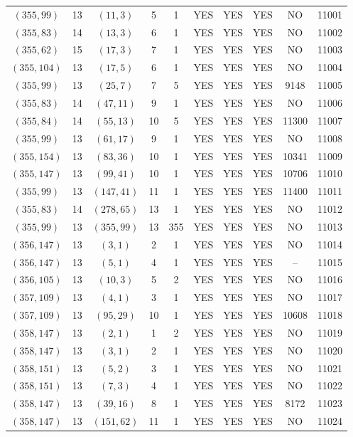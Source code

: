 \begin{longtable}{|c|c|c|c|c|c|c|c|c|c|}
$(355, 99)$ & 13 & $(11, 3)$ & 5 & 1 & YES & YES & YES & NO & 11001\\
$(355, 83)$ & 14 & $(13, 3)$ & 6 & 1 & YES & YES & YES & NO & 11002\\
$(355, 62)$ & 15 & $(17, 3)$ & 7 & 1 & YES & YES & YES & NO & 11003\\
$(355, 104)$ & 13 & $(17, 5)$ & 6 & 1 & YES & YES & YES & NO & 11004\\
$(355, 99)$ & 13 & $(25, 7)$ & 7 & 5 & YES & YES & YES & 9148 & 11005\\
$(355, 83)$ & 14 & $(47, 11)$ & 9 & 1 & YES & YES & YES & NO & 11006\\
$(355, 84)$ & 14 & $(55, 13)$ & 10 & 5 & YES & YES & YES & 11300 & 11007\\
$(355, 99)$ & 13 & $(61, 17)$ & 9 & 1 & YES & YES & YES & NO & 11008\\
$(355, 154)$ & 13 & $(83, 36)$ & 10 & 1 & YES & YES & YES & 10341 & 11009\\
$(355, 147)$ & 13 & $(99, 41)$ & 10 & 1 & YES & YES & YES & 10706 & 11010\\
$(355, 99)$ & 13 & $(147, 41)$ & 11 & 1 & YES & YES & YES & 11400 & 11011\\
$(355, 83)$ & 14 & $(278, 65)$ & 13 & 1 & YES & YES & YES & NO & 11012\\
$(355, 99)$ & 13 & $(355, 99)$ & 13 & 355 & YES & YES & YES & NO & 11013\\
$(356, 147)$ & 13 & $(3, 1)$ & 2 & 1 & YES & YES & YES & NO & 11014\\
$(356, 147)$ & 13 & $(5, 1)$ & 4 & 1 & YES & YES & YES & -- & 11015\\
$(356, 105)$ & 13 & $(10, 3)$ & 5 & 2 & YES & YES & YES & NO & 11016\\
$(357, 109)$ & 13 & $(4, 1)$ & 3 & 1 & YES & YES & YES & NO & 11017\\
$(357, 109)$ & 13 & $(95, 29)$ & 10 & 1 & YES & YES & YES & 10608 & 11018\\
$(358, 147)$ & 13 & $(2, 1)$ & 1 & 2 & YES & YES & YES & NO & 11019\\
$(358, 147)$ & 13 & $(3, 1)$ & 2 & 1 & YES & YES & YES & NO & 11020\\
$(358, 151)$ & 13 & $(5, 2)$ & 3 & 1 & YES & YES & YES & NO & 11021\\
$(358, 151)$ & 13 & $(7, 3)$ & 4 & 1 & YES & YES & YES & NO & 11022\\
$(358, 147)$ & 13 & $(39, 16)$ & 8 & 1 & YES & YES & YES & 8172 & 11023\\
$(358, 147)$ & 13 & $(151, 62)$ & 11 & 1 & YES & YES & YES & NO & 11024\\

\end{longtable}

